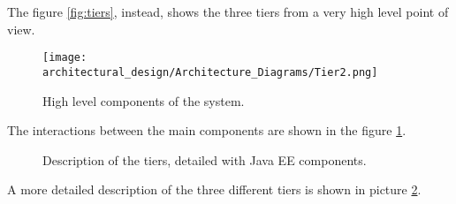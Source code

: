 The figure \ref{fig:tiers}, instead, shows the three tiers from a very high level point of view.

\begin{figure}
	\centering
	\texttt{[image: architectural\_design/Architecture\_Diagrams/Tier2.png]}
	\caption{High level components of the system.}
	\label{fig:high_components}
\end{figure}

The interactions between the main components are shown in the figure \ref{fig:high_components}.

\begin{figure}
    \vspace*{-2cm}
    \caption{Description of the tiers, detailed with Java EE components.}
	\label{fig:tiers_description}
\end{figure}

A more detailed description of the three different tiers is shown in picture \ref{fig:tiers_description}.


